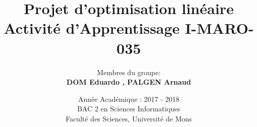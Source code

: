 \documentclass[]{article}
\begin{document}

\title{
{\Huge Projet d'optimisation linéaire}\\
\smallskip
{\small Activité d'Apprentissage \textsf{I-MARO-035}}\\
}

\author{
Membres du groupe:\\
\textbf{DOM Eduardo , PALGEN Arnaud}\\
}


\date{Année Académique : 2017 - 2018\\
BAC 2 en Sciences Informatiques\\
\vspace{1cm}
Faculté des Sciences, Université de Mons}


%
%
%
%
%
%


\maketitle              %
\end{document}
